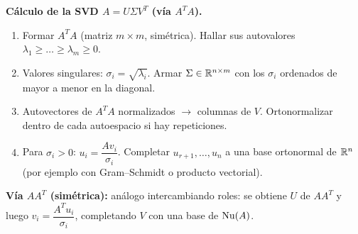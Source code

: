 \begin{receta}
\textbf{Cálculo de la SVD $A=U\Sigma V^T$ (vía $A^TA$).}
\begin{enumerate}
\item Formar $A^TA$ (matriz $m\times m$, simétrica). Hallar sus autovalores $\lambda_1\ge\dots\ge\lambda_m\ge0$.
\item Valores singulares: $\sigma_i=\sqrt{\lambda_i}$. Armar $\Sigma\in\mathbb{R}^{n\times m}$ con los $\sigma_i$ ordenados de mayor a menor en la diagonal.
\item Autovectores de $A^TA$ normalizados $\to$ columnas de $V$. Ortonormalizar dentro de cada autoespacio si hay repeticiones.
\item Para $\sigma_i>0$: $u_i=\dfrac{Av_i}{\sigma_i}$. Completar $u_{r+1},\dots,u_n$ a una base ortonormal de $\mathbb{R}^n$ (por ejemplo con Gram--Schmidt o producto vectorial).
\end{enumerate}
\textbf{Vía $AA^T$ (simétrica):} análogo intercambiando roles: se obtiene $U$ de $AA^T$ y luego $v_i=\dfrac{A^Tu_i}{\sigma_i}$, completando $V$ con una base de $\operatorname{Nu}(A)$.
\end{receta}

